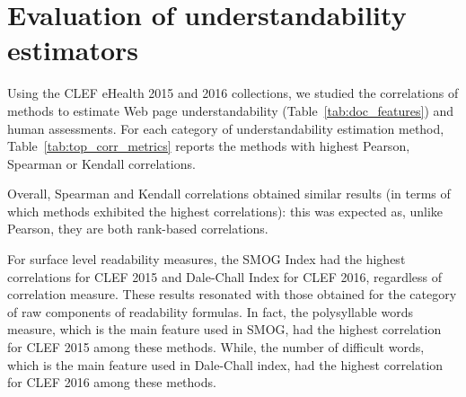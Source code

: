 \section{Evaluation of understandability estimators}
\label{sec:beyond_readability}
Using the CLEF eHealth 2015 and 2016 collections, we studied the correlations of methods to estimate Web page understandability (Table~\ref{tab:doc_features}) and human assessments. For each category of understandability estimation method, Table~\ref{tab:top_corr_metrics} reports the methods with highest Pearson, Spearman or Kendall correlations.

Overall, Spearman and Kendall correlations obtained similar results (in terms of which methods exhibited the highest correlations): this was expected as, unlike Pearson, they are both rank-based correlations.

For surface level readability measures,  the SMOG Index had the highest correlations for CLEF 2015 and Dale-Chall Index for CLEF 2016, regardless of correlation measure. These results resonated with those obtained for the category of raw components of readability formulas. In fact, the polysyllable words measure, which is the main feature used in SMOG, had the highest correlation for CLEF 2015 among these methods. While, the number of difficult words, which is the main feature used in Dale-Chall index, had the highest correlation for CLEF 2016 among these methods.





